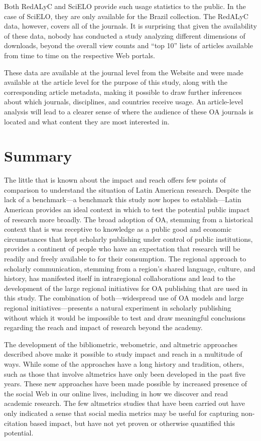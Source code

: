 Both RedALyC and SciELO provide such usage statistics to the public. In the case of SciELO, they are only available for the Brazil collection. The RedALyC data, however, covers all of the journals. It is surprising that given the availability of these data, nobody has conducted a study analyzing different dimensions of downloads, beyond the overall view counts and ``top 10'' lists of articles available from time to time on the respective Web portals.

These data are available at the journal level from the Website and were made available at the article level for the purpose of this study, along with the corresponding article metadata, making it possible to draw further inferences about which journals, disciplines, and countries receive usage. An article-level analysis will lead to a clearer sense of where the audience of these OA journals is located and what content they are most interested in.

\section{Summary}
\label{summary}

The little that is known about the impact and reach offers few points of comparison to understand the situation of Latin American research. Despite the lack of a benchmark—a benchmark this study now hopes to establish—Latin American provides an ideal context in which to test the potential public impact of research more broadly. The broad adoption of OA, stemming from a historical context that is was receptive to knowledge as a public good and economic circumstances that kept scholarly publishing under control of public institutions, provides a continent of people who have an expectation that research will be readily and freely available to for their consumption. The regional approach to scholarly communication, stemming from a region's shared language, culture, and history, has manifested itself in intraregional collaborations and lead to the development of the large regional initiatives for OA publishing that are used in this study. The combination of both—widespread use of OA models and large regional initiatives—presents a natural experiment in scholarly publishing without which it would be impossible to test and draw meaningful conclusions regarding the reach and impact of research beyond the academy.

The development of the bibliometric, webometric, and altmetric approaches described above make it possible to study impact and reach in a multitude of ways. While some of the approaches have a long history and tradition, others, such as those that involve altmetrics have only been developed in the past five years. These new approaches have been made possible by increased presence of the social Web in our online lives, including in how we discover and read academic research. The few altmetrics studies that have been carried out have only indicated a sense that social media metrics may be useful for capturing non-citation based impact, but have not yet proven or otherwise quantified this potential.

